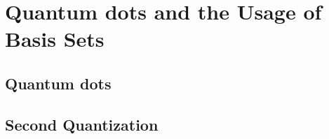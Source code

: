 \chapter{Quantum dots and the Usage of Basis Sets}
\label{c:background}

\section{Quantum dots}
\section{Second Quantization}